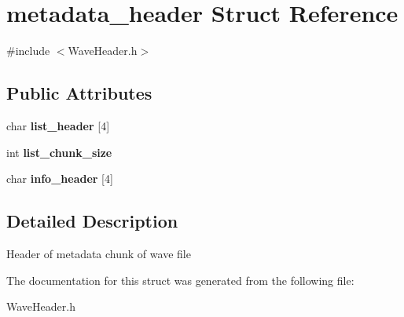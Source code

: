 \hypertarget{structmetadata__header}{}\section{metadata\+\_\+header Struct Reference}
\label{structmetadata__header}


{\ttfamily \#include $<$Wave\+Header.\+h$>$}

\subsection*{Public Attributes}
\begin{DoxyCompactItemize}
\item 
\mbox{\label{structmetadata__header_af3d4bcc76db5aa6293f680db68a74c3a}} 
char {\bfseries list\+\_\+header} \mbox{[}4\mbox{]}
\item 
\mbox{\label{structmetadata__header_a03c173721c82f8e9c753ef09e83c58c5}} 
int {\bfseries list\+\_\+chunk\+\_\+size}
\item 
\mbox{\label{structmetadata__header_a686b139a72f20c647b6b5d01f349c583}} 
char {\bfseries info\+\_\+header} \mbox{[}4\mbox{]}
\end{DoxyCompactItemize}


\subsection{Detailed Description}
Header of metadata chunk of wave file 

The documentation for this struct was generated from the following file\+:\begin{DoxyCompactItemize}
\item 
Wave\+Header.\+h\end{DoxyCompactItemize}
